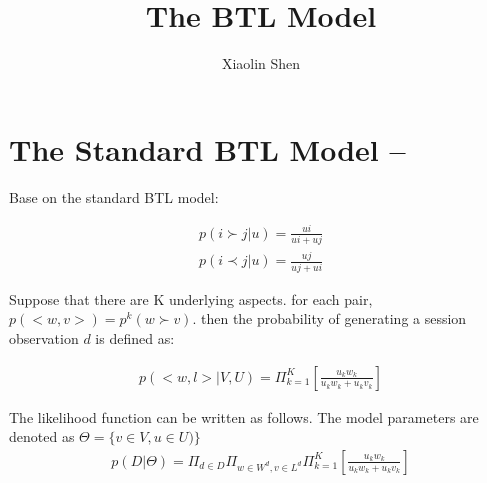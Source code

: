\documentclass{article}
\title{The BTL Model}
\author{Xiaolin Shen}
\begin{document}
\maketitle


\section{The Standard BTL Model --}
Base on the standard BTL model:

\begin{align*}
	p(i \succ j |u)=\frac{ui}{ui+ uj} \\
	p(i \prec j |u)=\frac{uj}{uj+ ui} 
\end{align*}

 Suppose that there are K underlying aspects. for each pair, $p(<w,v>) = p^k(w\succ v) $. then the probability of generating a session observation $d$ is defined as:

\begin{align}
p(<w,l>|V,U)
= \Pi_{k=1}^{K}[ {\frac{u_k w_k}{u_k w_k+u_k v_k}}]
\end{align}

The likelihood function can be written as follows. The model parameters are denoted as $ \Theta = \{ v \in V ,u \in U ) \}$
\begin{align}
p(D|\Theta)
=\Pi_{d \in D} \Pi_{w\in W^d, v\in L^d} \Pi_{k=1}^{K}[{\frac{u_k w_k}{u_k w_k+u_k v_k}}]
\end{align}
\end{document}
